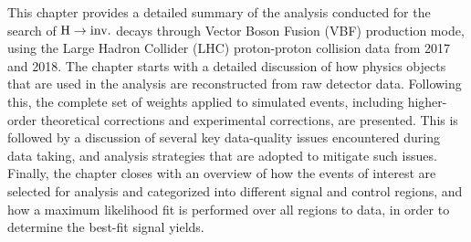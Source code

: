 \label{chap:data_analysis}

This chapter provides a detailed summary of the analysis
conducted for the search of $\textrm{H} \rightarrow \textrm{inv.}$ decays through Vector
Boson Fusion (VBF) production mode, using the Large Hadron Collider (LHC)
proton-proton collision data from 2017 and 2018.
The chapter starts with a detailed
discussion of how physics objects that are used in the analysis
are reconstructed from raw detector data. Following this, the 
complete set of weights applied to simulated events, including
higher-order theoretical corrections and experimental corrections,
are presented. This is followed by a discussion of several key 
data-quality issues encountered during data taking,
and analysis strategies that are adopted to mitigate such issues. Finally, the chapter
closes with an overview of how the events of interest are selected
for analysis and categorized into different signal and control regions, 
and how a maximum likelihood fit is performed over all regions 
to data, in order to determine the best-fit signal yields. 

\finishchapterabstract








